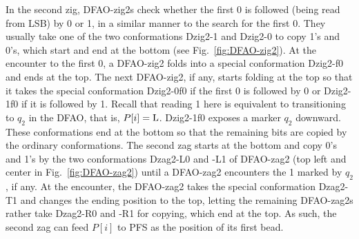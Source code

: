 In the second zig, DFAO-zig2s check whether the first 0 is followed (being read from LSB) by 0 or 1, in a similar manner to the search for the first 0.
They usually take one of the two conformations Dzig2-1 and Dzig2-0 to copy 1's and 0's, which start and end at the bottom (see Fig.~\ref{fig:DFAO-zig2}). 
At the encounter to the first 0, a DFAO-zig2 folds into a special conformation Dzig2-f0 and ends at the top. 
The next DFAO-zig2, if any, starts folding at the top so that it takes the special conformation Dzig2-0f0 if the first 0 is followed by 0 or Dzig2-1f0 if it is followed by 1. 
Recall that reading 1 here is equivalent to transitioning to $q_2$ in the DFAO, that is, $P[i] = {\rm L}$. 
Dzig2-1f0 exposes a marker $q_2$ downward. 
These conformations end at the bottom so that the remaining bits are copied by the ordinary conformations. 
The second zag starts at the bottom and copy 0's and 1's by the two conformations Dzag2-L0 and -L1 of DFAO-zag2 (top left and center in Fig.~\ref{fig:DFAO-zag2}) until a DFAO-zag2 encounters the 1 marked by $q_2$, if any. 
At the encounter, the DFAO-zag2 takes the special conformation Dzag2-T1 and changes the ending position to the top, letting the remaining DFAO-zag2s rather take Dzag2-R0 and -R1 for copying, which end at the top.
As such, the second zag can feed $P[i]$ to PFS as the position of its first bead.




